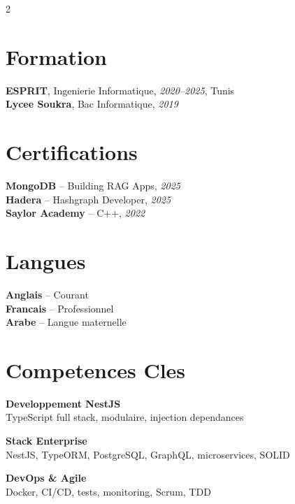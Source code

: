 \documentclass[10pt,a4paper]{article}
\begin{document}
\vspace{6pt}
\begin{multicols}{2}

\section*{Formation}
{\small
\textbf{ESPRIT}, Ingenierie Informatique, \textit{2020--2025}, Tunis\\[1pt]
\textbf{Lycee Soukra}, Bac Informatique, \textit{2019}
}

\vspace{3pt}
\section*{Certifications}
{\small
\textbf{MongoDB} -- Building RAG Apps, \textit{2025}\\[1pt]
\textbf{Hadera} -- Hashgraph Developer, \textit{2025}\\[1pt]
\textbf{Saylor Academy} -- C++, \textit{2022}
}

\columnbreak

\section*{Langues}
{\small
\textbf{Anglais} -- Courant\\[1pt]
\textbf{Francais} -- Professionnel\\[1pt]
\textbf{Arabe} -- Langue maternelle
}

\vspace{3pt}
\section*{Competences Cles}
{\small
\textbf{Developpement NestJS}\\[1pt]
TypeScript full stack, modulaire, injection dependances

\vspace{4pt}
\textbf{Stack Enterprise}\\[1pt]
NestJS, TypeORM, PostgreSQL, GraphQL, microservices, SOLID

\vspace{4pt}
\textbf{DevOps \& Agile}\\[1pt]
Docker, CI/CD, tests, monitoring, Scrum, TDD
}

\end{multicols}
\end{document}
